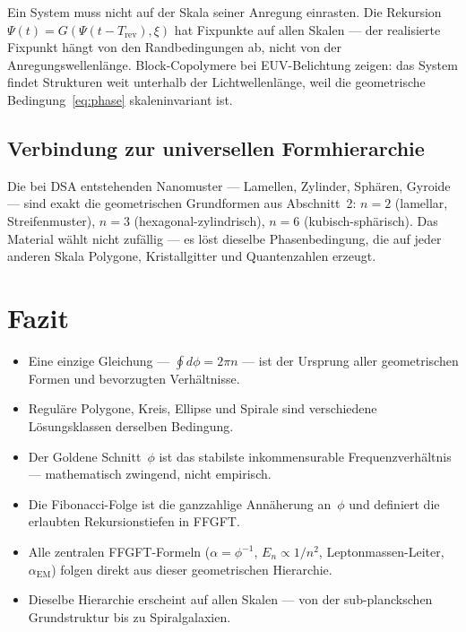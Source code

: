 \begin{keybox}
Ein System muss nicht auf der Skala seiner Anregung einrasten.
Die Rekursion $\Psi(t) = G(\Psi(t - T_{\text{rev}}), \xi)$ hat
Fixpunkte auf allen Skalen — der realisierte Fixpunkt hängt von
den Randbedingungen ab, nicht von der Anregungswellenlänge.
Block-Copolymere bei EUV-Belichtung zeigen: das System findet
Strukturen weit unterhalb der Lichtwellenlänge, weil die
geometrische Bedingung~\eqref{eq:phase} skaleninvariant ist.
\end{keybox}

\subsection{Verbindung zur universellen Formhierarchie}

Die bei DSA entstehenden Nanomuster — Lamellen, Zylinder, Sphären,
Gyroide — sind exakt die geometrischen Grundformen aus Abschnitt~2:
$n=2$ (lamellar, Streifenmuster), $n=3$ (hexagonal-zylindrisch),
$n=6$ (kubisch-sphärisch). Das Material wählt nicht zufällig —
es löst dieselbe Phasenbedingung, die auf jeder anderen Skala
Polygone, Kristallgitter und Quantenzahlen erzeugt.

\section{Fazit}

\begin{itemize}
  \item Eine einzige Gleichung — $\oint d\phi = 2\pi n$ — ist der
        Ursprung aller geometrischen Formen und bevorzugten Verhältnisse.
  \item Reguläre Polygone, Kreis, Ellipse und Spirale sind verschiedene
        Lösungsklassen derselben Bedingung.
  \item Der Goldene Schnitt~$\phi$ ist das stabilste inkommensurable
        Frequenzverhältnis — mathematisch zwingend, nicht empirisch.
  \item Die Fibonacci-Folge ist die ganzzahlige Annäherung an~$\phi$
        und definiert die erlaubten Rekursionstiefen in FFGFT.
  \item Alle zentralen FFGFT-Formeln ($\alpha = \phi^{-1}$,
        $E_n \propto 1/n^2$, Leptonmassen-Leiter, $\alpha_\text{EM}$)
        folgen direkt aus dieser geometrischen Hierarchie.
  \item Dieselbe Hierarchie erscheint auf allen Skalen — von der
        sub-planckschen Grundstruktur bis zu Spiralgalaxien.
\end{itemize}

